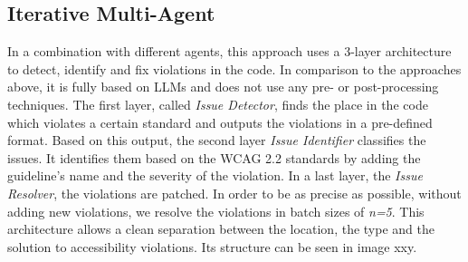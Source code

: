 \subsection{Iterative Multi-Agent}
In a combination with different agents, this approach uses a 3-layer architecture
to detect, identify and fix violations in the code. In comparison to the 
approaches above, it is fully based on LLMs and does not use any pre- or 
post-processing techniques. \newline
The first layer, called \textit{Issue Detector}, finds the place in the code which 
violates a certain standard and outputs the violations in a pre-defined format.
Based on this output, the second layer \textit{Issue Identifier} classifies the issues. 
It identifies them based on the WCAG 2.2 standards by 
adding the guideline's name and the severity of the violation. In a last 
layer, the \textit{Issue Resolver}, the violations are patched. In order to be 
as precise as possible, without adding new violations, we resolve the violations 
in batch sizes of \textit{n=5}.\newline
This architecture allows a clean separation between the location, the type and 
the solution to accessibility violations. Its structure can be seen in image xxy.
